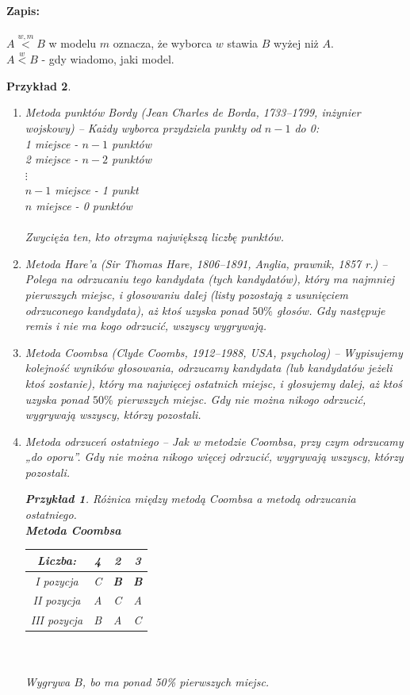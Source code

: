 \documentclass[12pt,a4paper]{article}
\theoremstyle{break}
\newtheorem{example}{Przykład}[section]
\begin{document}
	\textbf{Zapis:}\\\\
	$A\overset{w,m}{<}B$ w modelu $m$ oznacza, że wyborca $w$ stawia $B$ wyżej niż $A$.\\
	$A\overset{w}{<}B$ - gdy wiadomo, jaki model.
	
	\begin{example}
		\begin{enumerate}[1.]
			\item Metoda punktów Bordy (Jean Charles de Borda, 1733–1799, inżynier wojskowy) – Każdy wyborca przydziela punkty od $n-1$ do 0:\\
			1 miejsce - $n-1$ punktów\\
			2 miejsce - $n-2$ punktów\\
			$\vdots$ \\
			$n-1$ miejsce - 1 punkt\\
			$n$ miejsce - 0 punktów\\\\
			Zwycięża ten, kto otrzyma największą liczbę punktów.
			
			\item Metoda Hare'a (Sir Thomas Hare, 1806–1891, Anglia, prawnik, 1857 r.) – Polega na odrzucaniu tego kandydata (tych kandydatów), który ma najmniej pierwszych miejsc, i głosowaniu dalej (listy pozostają z usunięciem odrzuconego kandydata), aż ktoś uzyska ponad $50\%$ głosów. Gdy następuje remis i nie ma kogo odrzucić, wszyscy wygrywają.
			
			\item Metoda Coombsa (Clyde Coombs, 1912–1988, USA, psycholog) – Wypisujemy kolejność wyników głosowania, odrzucamy kandydata (lub kandydatów jeżeli ktoś zostanie), który ma najwięcej ostatnich miejsc, i głosujemy dalej, aż ktoś uzyska ponad $50\%$ pierwszych miejsc. Gdy nie można nikogo odrzucić, wygrywają wszyscy, którzy pozostali.
			
			\item Metoda odrzuceń ostatniego – Jak w metodzie Coombsa, przy czym odrzucamy „do oporu”. Gdy nie można nikogo więcej odrzucić, wygrywają wszyscy, którzy pozostali.
			
			\begin{example}
				Różnica między metodą Coombsa a metodą odrzucania ostatniego.\\
				
				\textbf{Metoda Coombsa}\\
				\begin{tabular}{|c|c|c|c|}\hline
					Liczba: & 4 & 2 & 3 \\\hline
					I pozycja & C & \textbf{B} & \textbf{B} \\\hline
					II pozycja & A & C & A \\\hline
					III pozycja & B & A & C \\\hline
				\end{tabular}\\\\
				Wygrywa $B$, bo ma ponad 50\% pierwszych miejsc.\\\\
				

\end{example}
\end{enumerate}
\end{example}
\end{document}
